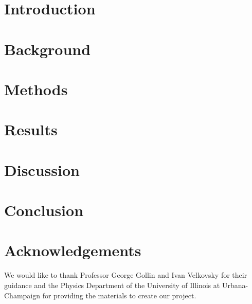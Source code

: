 \documentclass[10pt, letterpaper, notitlepage]{report}
\begin{document}


\doublespacing

\raggedright



 \tableofcontents

\setlength{\parindent}{4em}

 \chapter{Introduction}
 

 \chapter{Background}
 

 \chapter{Methods}
 

 \chapter{Results}
 

 \chapter{Discussion}
 

 \chapter{Conclusion}
 

 \clearpage

\chapter*{Acknowledgements}
\noindent
 We would like to thank Professor George Gollin and Ivan Velkovsky for their guidance and the Physics Department of the University of Illinois at Urbana-Champaign for providing the materials to create our project.

\justify

 \clearpage

 \listoffigures

 \clearpage

 \printbibliography[title={References}]
\end{document}
